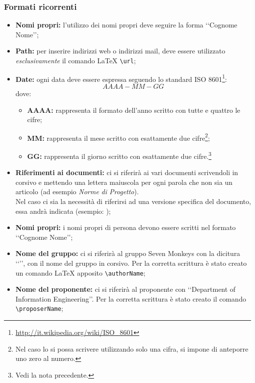\subsubsection{Formati ricorrenti}
\label{fricorrenti}
\begin{itemize}
\item \textbf{Nomi propri:} l'utilizzo dei nomi propri deve seguire la forma \lq\lq{}Cognome Nome\rq\rq{};
\item \textbf{Path:} per inserire indirizzi web o indirizzi mail, deve essere utilizzato \emph{esclusivamente} il comando \LaTeX{} \verb!\url!;
\item \textbf{Date:} ogni data deve essere espressa seguendo lo standard ISO 8601\footnote{\url{http://it.wikipedia.org/wiki/ISO_8601}}: 
\begin{displaymath}
	AAAA-MM-GG
\end{displaymath}
dove:
\begin{itemize}
\item \textbf{AAAA:} rappresenta il formato dell'anno scritto con tutte e quattro le cifre;
\item \textbf{MM:} rappresenta il mese scritto con esattamente due cifre\footnote{Nel caso lo si possa scrivere utilizzando solo una cifra, si impone di anteporre uno zero al numero.};
\item \textbf{GG:} rappresenta il giorno scritto con esattamente due cifre.\footnote{Vedi la nota precedente.}
\end{itemize}
\item \textbf{Riferimenti ai documenti:} ci si riferirà ai vari documenti scrivendoli in corsivo e mettendo una lettera maiuscola per ogni parola che non sia un articolo (ad esempio \emph{Norme di Progetto}). 
\\Nel caso ci sia la necessità di riferirsi ad una versione specifica del documento, essa andrà indicata (esempio: \NdP{});
\item \textbf{Nomi propri:} i nomi propri di persona devono essere scritti nel formato \lq\lq{}Cognome Nome\rq\rq{};
\item \textbf{Nome del gruppo:} ci si riferirà al gruppo Seven Monkeys con la dicitura \lq\lq{}\authorName{}\rq\rq{}, con il nome del gruppo in corsivo. Per la corretta scrittura è stato creato un comando \LaTeX{} apposito \verb!\authorName!;
\item \textbf{Nome del proponente:} ci si riferirà al proponente con \lq\lq{}Department of Information Engineering\rq\rq{}. Per la corretta scrittura è stato creato il comando \verb!\proposerName!;

\end{itemize}
